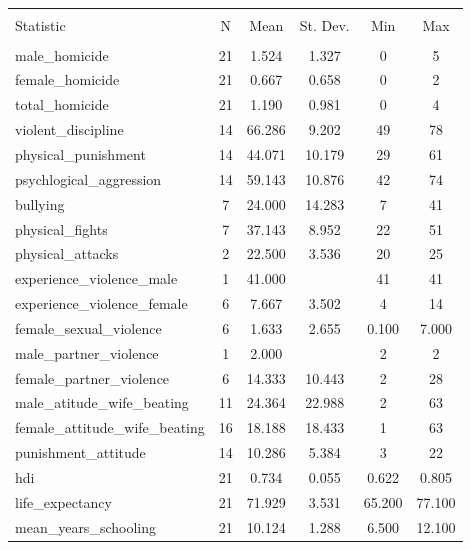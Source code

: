 \begin{table}[!htbp] \centering 
  \caption{} 
  \label{} 
\begin{tabular}{@{\extracolsep{5pt}}lccccc} 
\\[-1.8ex]\hline 
\hline \\[-1.8ex] 
Statistic & \multicolumn{1}{c}{N} & \multicolumn{1}{c}{Mean} & \multicolumn{1}{c}{St. Dev.} & \multicolumn{1}{c}{Min} & \multicolumn{1}{c}{Max} \\ 
\hline \\[-1.8ex] 
male\_homicide & 21 & 1.524 & 1.327 & 0 & 5 \\ 
female\_homicide & 21 & 0.667 & 0.658 & 0 & 2 \\ 
total\_homicide & 21 & 1.190 & 0.981 & 0 & 4 \\ 
violent\_discipline & 14 & 66.286 & 9.202 & 49 & 78 \\ 
physical\_punishment & 14 & 44.071 & 10.179 & 29 & 61 \\ 
psychlogical\_aggression & 14 & 59.143 & 10.876 & 42 & 74 \\ 
bullying & 7 & 24.000 & 14.283 & 7 & 41 \\ 
physical\_fights & 7 & 37.143 & 8.952 & 22 & 51 \\ 
physical\_attacks & 2 & 22.500 & 3.536 & 20 & 25 \\ 
experience\_violence\_male & 1 & 41.000 &  & 41 & 41 \\ 
experience\_violence\_female & 6 & 7.667 & 3.502 & 4 & 14 \\ 
female\_sexual\_violence & 6 & 1.633 & 2.655 & 0.100 & 7.000 \\ 
male\_partner\_violence & 1 & 2.000 &  & 2 & 2 \\ 
female\_partner\_violence & 6 & 14.333 & 10.443 & 2 & 28 \\ 
male\_atitude\_wife\_beating & 11 & 24.364 & 22.988 & 2 & 63 \\ 
female\_attitude\_wife\_beating & 16 & 18.188 & 18.433 & 1 & 63 \\ 
punishment\_attitude & 14 & 10.286 & 5.384 & 3 & 22 \\ 
hdi & 21 & 0.734 & 0.055 & 0.622 & 0.805 \\ 
life\_expectancy & 21 & 71.929 & 3.531 & 65.200 & 77.100 \\ 
mean\_years\_schooling & 21 & 10.124 & 1.288 & 6.500 & 12.100 \\ 

\end{tabular}
\end{table}
